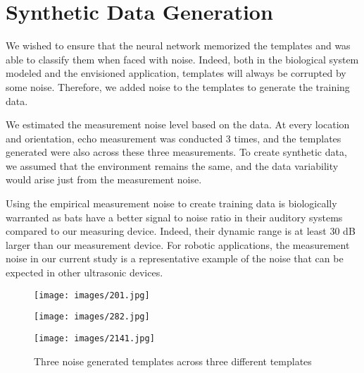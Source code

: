 \documentclass[11pt]{report}
\begin{document}
\section{Synthetic Data Generation}

We wished to ensure that the neural network memorized the templates and was able to classify them when faced with noise. Indeed, both in the biological system modeled and the envisioned application, templates will always be corrupted by some noise. Therefore, we added noise to the templates to generate the training data.

We estimated the measurement noise level based on the data. At every location and orientation, echo measurement was conducted 3 times, and the templates generated were also across these three measurements. To create synthetic data, we assumed that the environment remains the same, and the data variability would arise just from the measurement noise.

Using the empirical measurement noise to create training data is biologically warranted as bats have a better signal to noise ratio in their auditory systems compared to our measuring device. Indeed, their dynamic range is at least 30 dB larger than our measurement device. For robotic applications, the measurement noise in our current study is a representative example of the noise that can be expected in other ultrasonic devices. 






\begin{figure}[htbp]
    \centering
    \begin{minipage}{0.45\textwidth}
        \centering
        \texttt{[image: images/201.jpg]} %
    \end{minipage}\hfill
    \begin{minipage}{0.45\textwidth}
        \centering
        \texttt{[image: images/282.jpg]} %
    \end{minipage}
    \begin{minipage}{0.45\textwidth}
        \centering
        \texttt{[image: images/2141.jpg]} %
    \end{minipage}
    \caption{Three noise generated templates across three different templates}
    \label{NoiseData}
\end{figure}
\end{document}
